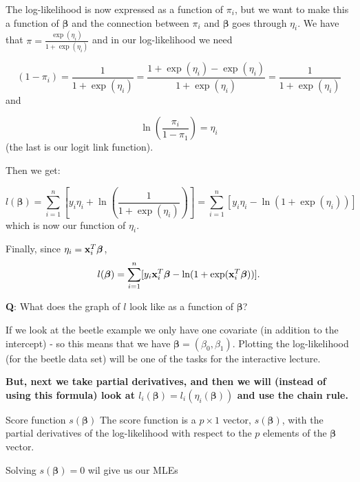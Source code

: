 \documentclass[
  ignorenonframetext,
]{beamer}
\begin{document}
\begin{frame}
The log-likelihood is now expressed as a function of \(\pi_i\), but we
want to make this a function of \(\boldsymbol{\beta}\) and the
connection between \(\pi_i\) and \(\boldsymbol{\beta}\) goes through
\(\eta_i\). We have that \(\pi=\frac{\exp(\eta_i)}{1+\exp(\eta_i)}\) and
in our log-likelihood we need

\[(1-\pi_i)=\frac{1}{1+\exp(\eta_i)}=\frac{1+\exp(\eta_i)-\exp(\eta_i)}{1+\exp(\eta_i)}=\frac{1}{1+\exp(\eta_i)}\]
and

\[\ln(\frac{\pi_i}{1-\pi_1})=\eta_i\] (the last is our logit link
function).
\end{frame}

\begin{frame}
Then we get:

\[l(\boldsymbol{\beta})=\sum_{i=1}^n[y_i \eta_i + \ln (\frac{1}{1+\exp(\eta_i)})]=\sum_{i=1}^n[y_i \eta_i - \ln (1+\exp(\eta_i))]\]
which is now our function of \(\eta_i\).

Finally, since \(\eta_i={\bf x}_i^T \boldsymbol{\beta}\),
\[l(\boldsymbol{\beta})=\sum_{i=1}^n[y_i {\bf x}_i^T \boldsymbol{\beta} - \ln (1+\exp({\bf x}_i^T \boldsymbol{\beta}))].\]
\end{frame}

\begin{frame}
\textbf{Q}: What does the graph of \(l\) look like as a function of
\(\boldsymbol{\beta}\)?

If we look at the beetle example we only have one covariate (in addition
to the intercept) - so this means that we have
\(\boldsymbol{\beta}=(\beta_0,\beta_1)\). Plotting the log-likelihood
(for the beetle data set) will be one of the tasks for the interactive
lecture.

\textbf{But, next we take partial derivatives, and then we will (instead
of using this formula) look at
\(l_i(\boldsymbol{\beta})=l_i(\eta_i(\boldsymbol{\beta}))\) and use the
chain rule.}
\end{frame}

\begin{frame}
\begin{block}{Score function \(s(\boldsymbol{\beta})\)}
\protect\hypertarget{score-function-sboldsymbolbeta}{}
The score function is a \(p\times 1\) vector, \(s(\boldsymbol{\beta})\),
with the partial derivatives of the log-likelihood with respect to the
\(p\) elements of the \(\boldsymbol{\beta}\) vector.

Solving \(s(\boldsymbol{\beta})=0\) wil give us our MLEs
\end{block}
\end{frame}
\end{document}
